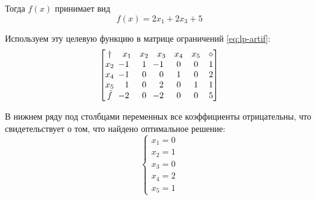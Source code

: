 Тогда $f(x)$ принимает вид
\begin{equation*}
  f(x) = 2x_1+2x_3+5
\end{equation*}

Используем эту целевую функцию в матрице ограничений \eqref{eq:lp-artif}:
\begin{equation*}
  \begin{bmatrix}
    \dagger & x_1 & x_2 & x_3 & x_4 & x_5 & \diamond\\
    x_2 &\mm{1}& 1 &\mm{1}& 0 & 0 & 1\\
    x_4 &\mm{1}& 0 &  0 & 1 & 0 & 2\\
    x_5 &  1 & 0 &  2 & 0 & 1 & 1\\
    \tilde{f} & \mm{2} & 0 & \mm{2} & 0 & 0 & 5
  \end{bmatrix}
\end{equation*}

В нижнем ряду под столбцами переменных все коэффициенты отрицательны,
что свидетельствует о том, что найдено оптимальное решение:
\begin{equation}
  \begin{cases}
    x_1 = 0\\
    x_2 = 1\\
    x_3 = 0\\
    x_4 = 2\\
    x_5 = 1
  \end{cases}
\end{equation}
